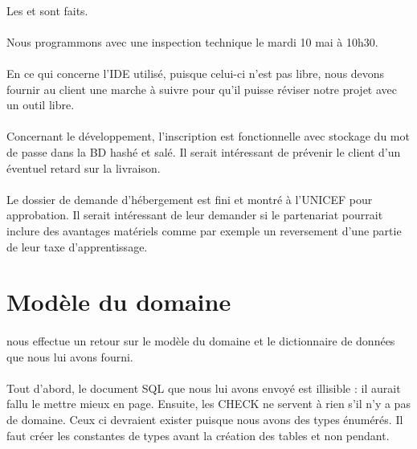 \documentclass [a4paper] {article}
\begin{document}
\paragraph*{}
Les \PTI{} et \PTU{} sont faits.
\paragraph*{}
Nous programmons avec \nomTuteurPedago{} une inspection technique le mardi 10 mai à 10h30.
\paragraph*{}
En ce qui concerne l'IDE utilisé, puisque celui-ci n'est pas libre, nous devons fournir au client une marche à suivre pour qu'il puisse réviser notre projet avec un outil libre.
\paragraph*{}
Concernant le développement, l'inscription est fonctionnelle avec stockage du mot de passe dans la BD hashé et salé. Il serait intéressant de prévenir le client d'un éventuel retard sur la livraison.
\paragraph*{}
Le dossier de demande d'hébergement est fini et montré à l'UNICEF pour approbation. Il serait intéressant de leur demander si le partenariat pourrait inclure des avantages matériels comme par exemple un reversement d'une partie de leur taxe d'apprentissage.

\section{Modèle du domaine}
\paragraph*{}
\nomTuteurPedago{} nous effectue un retour sur le modèle du domaine et le dictionnaire de données que nous lui avons fourni.
\paragraph*{}
Tout d'abord, le document SQL que nous lui avons envoyé est illisible : il aurait fallu le mettre mieux en page. Ensuite, les CHECK ne servent à rien s'il n'y a pas de domaine. Ceux ci devraient exister puisque nous avons des types énumérés. Il faut créer les constantes de types avant la création des tables et non pendant.\\






\newpage
\end{document}

